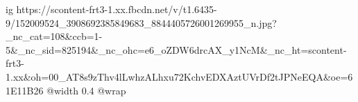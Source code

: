  
 
 
 
 

\ifcmt
  ig https://scontent-frt3-1.xx.fbcdn.net/v/t1.6435-9/152009524_3908692385849683_8844405726001269955_n.jpg?_nc_cat=108&ccb=1-5&_nc_sid=825194&_nc_ohc=e6_oZDW6drcAX_y1NcM&_nc_ht=scontent-frt3-1.xx&oh=00_AT8s9zThv4lLwhzALhxu72KchvEDXAztUVrDf2tJPNeEQA&oe=61E11B26
  @width 0.4
  @wrap 
\fi
